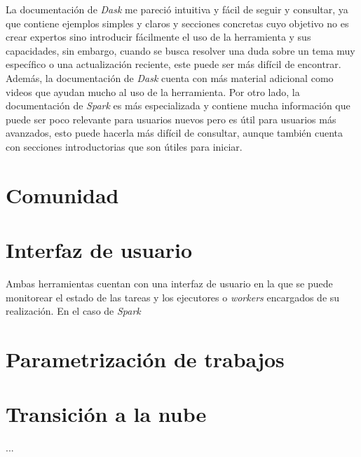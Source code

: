 La documentación de \textit{Dask} me pareció intuitiva y fácil de seguir y consultar, ya que contiene ejemplos simples y claros y secciones concretas cuyo objetivo no es crear expertos sino introducir fácilmente el uso de la herramienta y sus capacidades, sin embargo, cuando se busca resolver una duda sobre un tema muy específico o una actualización reciente, este puede ser más difícil de encontrar. Además, la documentación de \textit{Dask} cuenta con más material adicional como videos que ayudan mucho al uso de la herramienta. Por otro lado, la documentación de \textit{Spark} es más especializada y contiene mucha información que puede ser poco relevante para usuarios nuevos pero es útil para usuarios más avanzados, esto puede hacerla más difícil de consultar, aunque también cuenta con secciones introductorias que son útiles para iniciar. 

\section{Comunidad}

\section{Interfaz de usuario}

Ambas herramientas cuentan con una interfaz de usuario en la que se puede monitorear el estado de las tareas y los ejecutores o \textit{workers} encargados de su realización. En el caso de \textit{Spark}

\section{Parametrización de trabajos}

\section{Transición a la nube}

\noindent ...

